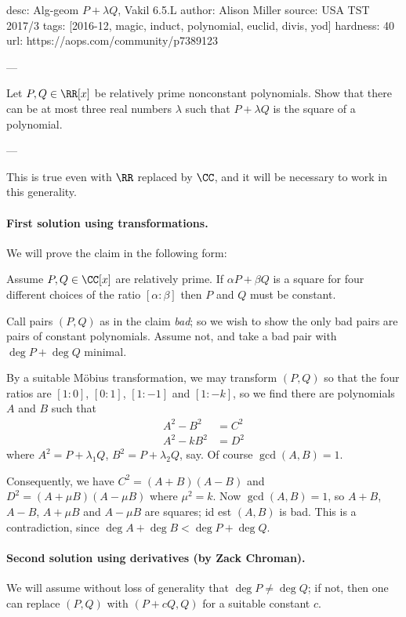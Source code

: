 desc: Alg-geom $P + \lambda Q$, Vakil 6.5.L
author: Alison Miller
source: USA TST 2017/3
tags: [2016-12, magic, induct, polynomial, euclid, divis, yod]
hardness: 40
url: https://aops.com/community/p7389123

---

Let $P, Q \in \RR[x]$ be relatively prime nonconstant polynomials.
Show that there can be at most three real numbers $\lambda$
such that $P + \lambda Q$ is the square of a polynomial.

---

This is true even with $\RR$ replaced by $\CC$,
and it will be necessary to work in this generality.

\paragraph{First solution using transformations.}
We will prove the claim in the following form:

\begin{claim*}
Assume $P, Q \in \CC[x]$ are relatively prime.
If $\alpha P + \beta Q$ is a square for four different
choices of the ratio $[\alpha : \beta]$
then $P$ and $Q$ must be constant.
\end{claim*}

Call pairs $(P,Q)$ as in the claim \emph{bad};
so we wish to show the only bad pairs are pairs of constant polynomials.
Assume not, and take a bad pair with $\deg P + \deg Q$ minimal.

By a suitable M\"obius transformation,
we may transform $(P,Q)$ so that the four ratios are $[1:0]$,
$[0:1]$, $[1:-1]$ and $[1:-k]$,
so we find there are polynomials $A$ and $B$ such that
\begin{align*}
  A^2 - B^2 &= C^2 \\
  A^2 - k B^2 &= D^2
\end{align*}
where $A^2 = P+\lambda_1 Q$, $B^2 = P+\lambda_2 Q$, say.
Of course $\gcd(A,B) = 1$.

Consequently, we have $C^2 = (A+B)(A-B)$
and $D^2 = (A+\mu B)(A-\mu B)$ where $\mu^2 = k$.
Now $\gcd(A,B) = 1$, so $A+B$, $A-B$, $A+ \mu B$ and $A - \mu B$
are squares; id est $(A,B)$ is bad.
This is a contradiction, since $\deg A + \deg B < \deg P + \deg Q$.

\paragraph{Second solution using derivatives (by Zack Chroman).}
We will assume without loss of generality that $\deg P \neq \deg Q$;
if not, then one can replace $(P,Q)$ with $(P+cQ,Q)$
for a suitable constant $c$.

